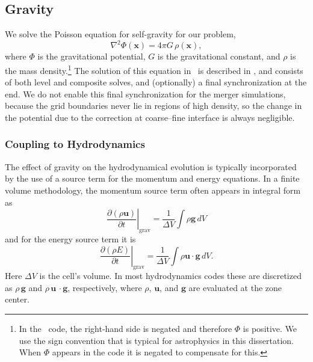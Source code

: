 \documentclass[12pt]{article}
\begin{document}
\subsection{Gravity}
\label{sec:gravity}

We solve the Poisson equation for self-gravity for our problem,
\begin{equation}
  \nabla^2 \Phi(\mathbf{x}) = 4\pi G\, \rho(\mathbf{x}),
\end{equation}
where $\Phi$ is the gravitational potential, $G$ is the gravitational
constant, and $\rho$ is the mass density.\footnote{In the \castro\ code, the 
right-hand side is negated and therefore $\Phi$ is positive. We use the 
sign convention that is typical for astrophysics in this dissertation. 
When $\Phi$ appears in the code it is negated to compensate for this.} 
The solution of this equation in \castro\ is described in \cite{castro}, and
consists of both level and composite solves, and (optionally) a final
synchronization at the end. We do not enable this final synchronization
for the merger simulations, because the grid boundaries never lie in
regions of high density, so the change in the potential due to the correction
at coarse--fine interface is always negligible.

\subsubsection{Coupling to Hydrodynamics}\label{sec:gravity_hydro_coupling}

The effect of gravity on the hydrodynamical evolution is typically
incorporated by the use of a source term for the momentum and energy
equations. In a finite volume methodology, the momentum source term 
often appears in integral form as
\begin{equation}
  \left.\frac{\partial (\rho \mathbf{u})}{\partial t}\right|_{\text{grav}} = \frac{1}{\Delta V} \int \rho \mathbf{g}\, dV
\end{equation}
and for the energy source term it is
\begin{equation}
  \left.\frac{\partial (\rho E)}{\partial t}\right|_{\text{grav}} = \frac{1}{\Delta V} \int \rho \mathbf{u}\cdot\mathbf{g}\, dV \label{eq:cell_center_gravity_source}.
\end{equation}
Here $\Delta V$ is the cell's volume.
In most hydrodynamics codes these are discretized as $\rho\,
\mathbf{g}$ and $\rho\, \mathbf{u}\,\cdot\mathbf{g}$, respectively, 
where $\rho$, $\mathbf{u}$, and $\mathbf{g}$ 
are evaluated at the zone center. 
\end{document}
